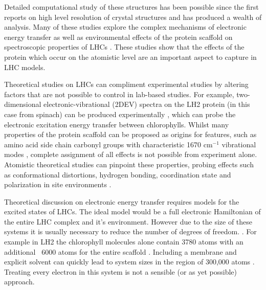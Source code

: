 Detailed computational study of these structures has been possible since the first
reports on high level resolution of crystal structures \cite{Mcdermott1995, Koepke1996} 
and has produced a wealth of analysis. Many of these studies explore the complex 
mechanisms of electronic energy transfer as well as environmental effects of the 
protein scaffold on spectroscopic properties of LHCs \cite{SlaMa2020, Jang2015, Curutchet2016, Mirkovic2016}. 
These studies show that the effects of the protein which occur on the atomistic
level are an important aspect to capture in LHC models.

Theoretical studies on LHCs can compliment experimental studies by altering factors
that are not possible to control in lab-based studies. For example, two-dimensional
electronic-vibrational (2DEV) spectra on the LH2 protein (in this case from spinach)
can be produced experimentally \cite{CLewis2016}, which can probe the electronic 
excitation energy transfer between chlorophylls. Whilst many properties of the protein 
scaffold can be proposed as origins for features, such as amino acid side chain 
carbonyl groups with characteristic 1670 $\text{cm}^{-1}$ vibrational modes \cite{Barth2000}, 
complete assignment of all effects is not possible from experiment alone. Atomistic
theoretical studies can pinpoint these properties, probing effects such as conformational
distortions, hydrogen bonding, coordination state and polarization in site environments \cite{CLewis2016, Lewis2015}.  

Theoretical discussion on electronic energy transfer requires models for the excited
states of LHCs. The ideal model would be a full electronic Hamiltonian of the entire
LHC complex and it's environment. However due to the size of these systems it is
usually necessary to reduce the number of degrees of freedom. \cite{Mallus2018, SlaMa2020}. 
For example in LH2 the chlorophyll molecules alone contain 3780 atoms with an additional 
~6000 atoms for the entire scaffold \cite{Neugebauer2008, Cherezov2006}. Including
a membrane and explicit solvent can quickly lead to system sizes in the region of
300,000 atoms \cite{Mennucci2019}. Treating every electron in this system is not
a sensible (or as yet possible) approach.

